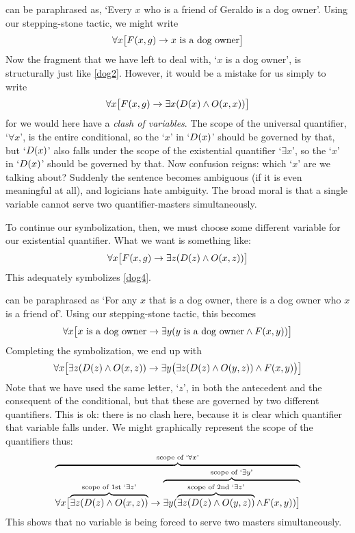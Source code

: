  can be paraphrased as, `Every $x$ who is a friend of Geraldo is a dog owner'. Using our stepping-stone tactic, we might write 
$$\forall x \bigl[F(x,g) \rightarrow x \text{ is a dog owner}\bigr]$$
Now the fragment that we have left to deal with, `$x$ is a dog owner', is structurally just like \cref*{dog2}. However, it would be a mistake for us simply to write 
$$\forall x \bigl[F(x,g) \rightarrow \exists x(D(x) \wedge O(x,x))\bigr]$$
for we would here have a \emph{clash of variables}. The scope of the universal quantifier, `$\forall x$', is the entire conditional, so the `$x$' in `$D(x)$' should be governed by that, but `$D(x)$' also falls under the scope of the existential quantifier `$\exists x$', so the `$x$' in `$D(x)$' should be governed by that. Now confusion reigns: which `$x$' are we talking about? Suddenly the sentence becomes ambiguous (if it is even meaningful at all), and logicians hate ambiguity. The broad moral is that a single variable cannot serve two quantifier-masters simultaneously.

To continue our symbolization, then, we must choose some different variable for our existential quantifier. What we want is something like:
$$\forall x\bigl[F(x,g) \rightarrow\exists z(D(z) \wedge O(x,z))\bigr]$$
This adequately symbolizes \cref*{dog4}.

 can be paraphrased as `For any $x$ that is a dog owner, there is a dog owner who $x$ is a friend of'. Using our stepping-stone tactic, this becomes 
$$\forall x\bigl[\mbox{$x$ is a dog owner}\rightarrow\exists y(\mbox{$y$ is a dog owner}\wedge F(x,y))\bigr]$$
Completing the symbolization, we end up with
$$\forall x\bigl[\exists z(D(z) \wedge O(x,z))\rightarrow\exists y\bigl(\exists z(D(z) \wedge O(y,z))\wedge F(x,y)\bigr)\bigr]$$
Note that we have used the same letter, `$z$', in both the antecedent and the consequent of the conditional, but that these are governed by two different quantifiers. This is ok: there is no clash here, because it is clear which quantifier that variable falls under. We might graphically represent the scope of the quantifiers thus:
$$\overbrace{\forall x\bigl[\overbrace{\exists z(D(z) \wedge O(x,z))}^{\text{scope of 1st `}\exists z\text{'}}\rightarrow \overbrace{\exists y(\overbrace{\exists z(D(z) \wedge O(y,z))}^{\text{scope of 2nd `}\exists z\text{'}}\wedge F(x,y))\bigr]}^{\text{scope of `}\exists y\text{'}}}^{\text{scope of `}\forall x\text{'}}$$
This shows that no variable is being forced to serve two masters simultaneously.

